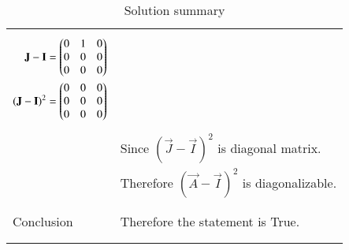 \begin{longtable}{|l|l|}
{\begin{align*}
    \mathbf{J}-\mathbf{I}&=\begin{pmatrix}0&1&0\\0&0&0\\0&0&0\end{pmatrix}\\
    (\mathbf{J}-\mathbf{I})^2&=\begin{pmatrix}0&0&0\\0&0&0\\0&0&0\end{pmatrix}
\end{align*}}\\
&Since $(\vec{J}-\vec{I})^2$ is diagonal matrix.\\
&Therefore $(\vec{A}-\vec{I})^2$ is diagonalizable.\\
&\\
\hline
&\\
Conclusion&Therefore the statement is True.\\
&\\
\hline
\caption{Solution summary}
\label{eq:solutions/2018/dec/74/table:2}
\end{longtable}

\twocolumn
